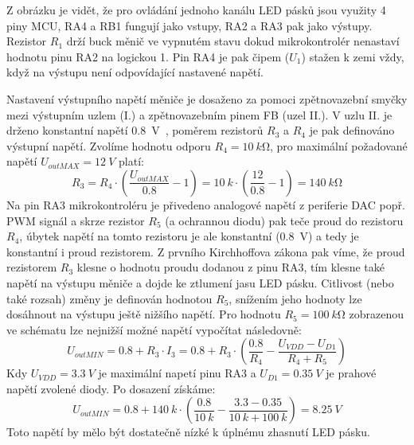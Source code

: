     Z obrázku je vidět, že pro ovládání jednoho kanálu LED pásků jsou využity 4 piny MCU, RA4 a RB1 fungují jako vstupy, RA2 a RA3 pak jako výstupy. Rezistor \(R_{1}\) drží buck měnič ve vypnutém stavu dokud mikrokontrolér nenastaví hodnotu pinu RA2 na logickou 1. Pin RA4 je pak čipem (\(U_{1} \)) stažen k zemi vždy, když na výstupu není odpovídající nastavené napětí.  
    
    Nastavení výstupního napětí měniče je dosaženo za pomoci zpětnovazební smyčky mezi výstupním uzlem (I.) a zpětnovazebním pinem FB (uzel II.). V uzlu II. je drženo konstantní napětí \qty{0.8}{V}~\cite{Diodes_AP63356Q}, poměrem rezistorů \(R_{3} \) a \(R_{4} \) je pak definováno výstupní napětí. Zvolíme hodnotu odporu \(R_{4} = \qty{10}{k\ohm}\), pro maximální požadované napětí \(U_{outMAX} = \qty{12}{V}\) platí:
    \begin{equation}
        R_{3} = R_{4}\cdot \left(\frac{U_{outMAX} }{\num{0.8}}-1\right) = \qty{10}{k}\cdot \left(\frac{12}{\num{0.8}}-1\right) = \qty{140}{k\ohm}
    \end{equation} 
    Na pin RA3 mikrokontroléru je přivedeno analogové napětí z periferie DAC popř. PWM signál a skrze rezistor \(R_{5} \) (a ochrannou diodu) pak teče proud do rezistoru \(R_{4} \), úbytek napětí na tomto rezistoru je ale konstantní (\qty{0.8}{V}) a tedy je konstantní i proud rezistorem. Z prvního Kirchhoffova zákona pak víme, že proud rezistorem \(R_{3} \) klesne o hodnotu proudu dodanou z pinu RA3, tím klesne také napětí na výstupu měniče a dojde ke ztlumení jasu LED pásku. Citlivost (nebo také rozsah) změny je definován hodnotou \(R_{5} \), snížením jeho hodnoty lze dosáhnout na výstupu ještě nižšího napětí. Pro hodnotu \(R_{5} = \qty{100}{k\ohm}\) zobrazenou ve schématu lze nejnižší možné napětí vypočítat následovně:
    \begin{equation}
        U_{outMIN} = \num{0.8}+R_{3} \cdot I_{3} = \num{0.8}+R_{3} \cdot \left(\frac{\num{0.8}}{R_{4}} - \frac{U_{VDD} - U_{D1}}{R_{4}+R_{5}} \right) 
    \end{equation}  
    Kdy \(U_{VDD} = \qty{3.3}{V}\) je maximální napetí pinu RA3 a \(U_{D1}=\qty{0.35}{V} \) je prahové napětí zvolené diody. Po dosazení získáme:
    \begin{equation}
        U_{outMIN} = \num{0.8}+\qty{140}{k} \cdot \left(\frac{\num{0.8}}{\qty{10}{k}} - \frac{\num{3.3} - \num{0.35}}{\qty{10}{k}+\qty{100}{k}} \right) = \qty{8.25}{V}
    \end{equation}  
    Toto napětí by mělo být dostatečně nízké k úplnému zhasnutí LED pásku.

